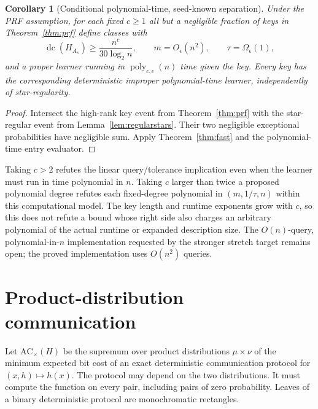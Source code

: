 \documentclass[11pt]{article}
\newtheorem{corollary}[theorem]{Corollary}
\DeclareMathOperator{\dc}{dc}
\newcommand{\1}{\mathbf 1}
\begin{document}
\begin{samepage}
\begin{corollary}[Conditional polynomial-time, seed-known separation]\label{cor:fastprf}
Under the PRF assumption, for each fixed $c\ge1$ all but a negligible fraction of keys in Theorem~\ref{thm:prf} define classes with
\[
 \dc(H_{A_s})\ge\frac{n^c}{30\log_2n},\qquad
 m=O_\epsilon(n^2),\qquad\tau=\Omega_\epsilon(1),
\]
and a proper learner running in $\operatorname{poly}_{c,\epsilon}(n)$ time given the key. Every key has the corresponding deterministic improper polynomial-time learner, independently of star-regularity.
\end{corollary}
\end{samepage}
\begin{proof}
Intersect the high-rank key event from Theorem~\ref{thm:prf} with the star-regular event from Lemma~\ref{lem:regularstars}. Their two negligible exceptional probabilities have negligible sum. Apply Theorem~\ref{thm:fast} and the polynomial-time entry evaluator.
\end{proof}

Taking $c>2$ refutes the linear query/tolerance implication even when the learner must run in time polynomial in $n$. Taking $c$ larger than twice a proposed polynomial degree refutes each fixed-degree polynomial in $(m,1/\tau,n)$ within this computational model. The key length and runtime exponents grow with $c$, so this does not refute a bound whose right side also charges an arbitrary polynomial of the actual runtime or expanded description size. The $O(n)$-query, polynomial-in-$n$ implementation requested by the stronger stretch target remains open; the proved implementation uses $O(n^2)$ queries.



\section{Product-distribution communication}\label{sec:communication}
Let $\mathrm{AC}_{\times}(H)$ be the supremum over product distributions $\mu\times\nu$ of the minimum expected bit cost of an exact deterministic communication protocol for $(x,h)\mapsto h(x)$. The protocol may depend on the two distributions. It must compute the function on every pair, including pairs of zero probability. Leaves of a binary deterministic protocol are monochromatic rectangles.
\end{document}
